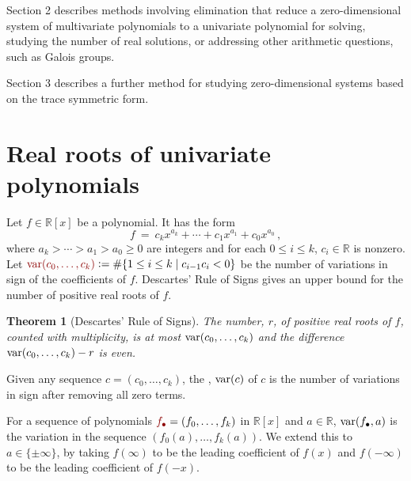 \documentclass[12pt]{amsart}
\newtheorem{theorem}{Theorem}
\theoremstyle{definition}
\newcommand{\RR}{\mathbb{R}}
\DeclareMathOperator{\var}{{\rm var}}
\newcommand{\defcolor}[1]{{\color{TAMU}#1}}
\newcommand{\demph}[1]{\defcolor{{\sl #1}}}
\begin{document}
Section 2 describes methods involving elimination that reduce a zero-dimensional system of multivariate polynomials to a univariate
polynomial for solving, studying the number of real solutions, or addressing other arithmetic questions, such as Galois groups.

Section 3 describes a further method for studying zero-dimensional systems based on the trace symmetric form.


\section{Real roots of univariate polynomials}\label{S:one}

Let $f\in\RR[x]$ be a polynomial.
It has the form
%
 \[
   f\ =\ c_kx^{a_k}  + \dotsb + c_{1}x^{a_{1}} + c_0x^{a_0}\,,
 \]
%
where $a_k> \dotsb > a_1 > a_0 \geq 0$ are integers and for each $0\leq i \leq k$, $c_{i}\in\RR$ is nonzero.
Let $\defcolor{\var(c_0,\dotsc,c_k)}\vcentcolon=\#\{1\leq i\leq k\mid c_{i-1}c_i<0\}$ be the number of variations in sign of the
coefficients of $f$.
Descartes' Rule of Signs \cite{So_Book} gives an upper bound for the number of positive real roots of $f$.

\begin{theorem}[Descartes' Rule of Signs]
  The number, $r$,  of positive real roots of $f$, counted with multiplicity, is at most $\var(c_0,\dotsc,c_k)$ and the difference
  $\var(c_0,\dotsc,c_k)-r$ is even.
\end{theorem}

Given any sequence $c=(c_0,\dotsc,c_k)$, the \demph{variation},  \defcolor{$\var(c)$} of $c$ is the
number of variations in sign after removing all zero terms.
%
\begin{leftbar}

\end{leftbar}
%
For a sequence of polynomials  $\defcolor{f_\bullet}=(f_0,\dotsc,f_k)$ in $\RR[x]$ and $a\in\RR$, \defcolor{$\var(f_\bullet,a)$} is the
variation in the sequence 
$(f_0(a),\dotsc,f_{k}(a))$. 
We extend this to $a\in\{\pm\infty\}$, by taking $f(\infty)$ to be the leading coefficient of $f(x)$ and $f(-\infty)$ to be the leading
coefficient of $f(-x)$.
\end{document}
